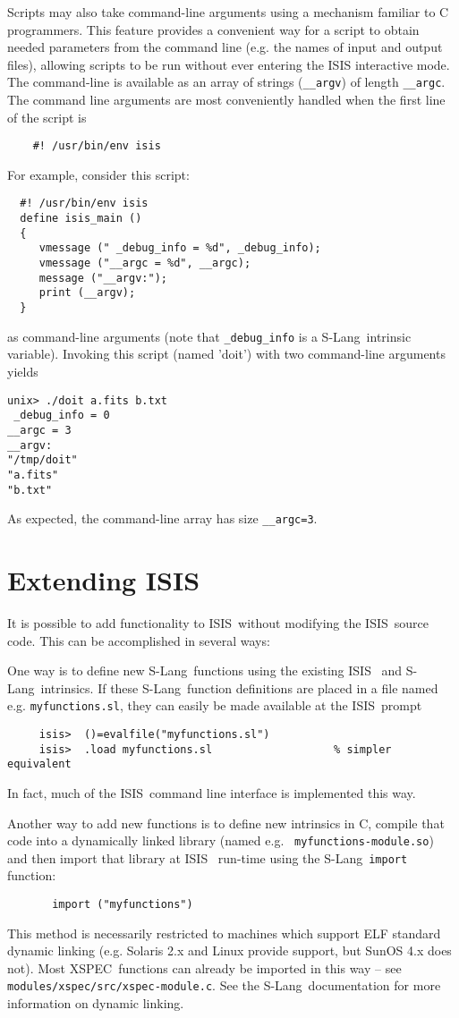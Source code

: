 \documentclass{book}
\newcommand{\isisx}{{\sc ISIS~}}
\newcommand{\slang}{{\sc S-Lang}}
\newcommand{\xspec}{{\sc XSPEC}}
\begin{document}
{Scripts may also take command-line arguments using a mechanism
familiar to C programmers. This feature provides a convenient
way for a script to obtain needed parameters from the command
line (e.g. the names of input and output files), allowing
scripts to be run without ever entering the ISIS interactive
mode. The command-line is available as an array of strings
(\verb|__argv|) of length \verb|__argc|. The command line
arguments are most conveniently handled when the first line of
the script is
\begin{verbatim}
    #! /usr/bin/env isis
\end{verbatim}
For example, consider this script:
\begin{verbatim}
  #! /usr/bin/env isis
  define isis_main ()
  {
     vmessage (" _debug_info = %d", _debug_info);
     vmessage ("__argc = %d", __argc);
     message ("__argv:");
     print (__argv);
  }
\end{verbatim}
as command-line arguments (note that \verb|_debug_info| is a
\slang\ intrinsic variable).  Invoking this script (named 'doit')
with two command-line arguments yields
\begin{verbatim}
unix> ./doit a.fits b.txt
 _debug_info = 0
__argc = 3
__argv:
"/tmp/doit"
"a.fits"
"b.txt"
\end{verbatim}
As expected, the command-line array has size \verb|__argc=3|.

\section{Extending ISIS}
\label{sec:extending-isis}

It is possible to add functionality to \isisx without modifying the
\isisx source code.  This can be accomplished in several ways:

One way is to define new \slang\ functions using the existing \isisx
and \slang\ intrinsics.  If these \slang\ function definitions
are placed in a file named e.g. {\tt myfunctions.sl}, they
can easily be made available at the \isisx prompt
\begin{verbatim}
     isis>  ()=evalfile("myfunctions.sl")
     isis>  .load myfunctions.sl                   % simpler equivalent
\end{verbatim}
In fact, much of the \isisx command line interface is implemented this way.

Another way to add new functions is to define new intrinsics in C,
compile that code into a dynamically linked library (named e.g.  {\tt
myfunctions-module.so}) and then import that library at \isisx
run-time using the \slang\ {\tt import} function:
\begin{verbatim}
       import ("myfunctions")
\end{verbatim}
This method is necessarily restricted to machines which support
ELF standard dynamic linking (e.g. Solaris 2.x and Linux provide
support, but SunOS 4.x does not).  Most \xspec\ functions
can already be imported in this way -- see
\verb|modules/xspec/src/xspec-module.c|.  See the \slang\
documentation for more information on dynamic linking.

}
\end{document}
